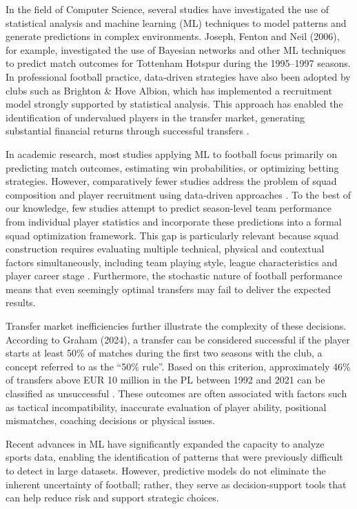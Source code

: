 \documentclass[a4paper,fleqn]{cas-sc}
\begin{document}
In the field of Computer Science, several studies have investigated the use of statistical analysis and machine learning (ML) techniques to model 
patterns and generate predictions in complex environments. Joseph, Fenton and Neil (2006), for example, investigated the use of Bayesian networks and 
other ML techniques to predict match outcomes for Tottenham Hotspur during the 1995–1997 seasons. In professional football practice, data-driven strategies 
have also been adopted by clubs such as Brighton \& Hove Albion, which has implemented a recruitment model strongly supported by statistical analysis. This 
approach has enabled the identification of undervalued players in the transfer market, generating substantial financial returns through successful 
transfers \cite{BBC2023Caicedo, CNN2023Caicedo, ESPN2023}.

In academic research, most studies applying ML to football focus primarily on predicting match outcomes, estimating win probabilities, or optimizing 
betting strategies. However, comparatively fewer studies address the problem of squad composition and player recruitment using data-driven 
approaches \cite{Abidin2021}. To the best of our knowledge, few studies attempt to predict season-level team performance from individual player statistics 
and incorporate these predictions into a formal squad optimization framework. This gap is particularly relevant because squad construction requires 
evaluating multiple technical, physical and contextual factors simultaneously, including team playing style, league characteristics and player career 
stage \cite{Abidin2021}. Furthermore, the stochastic nature of football performance means that even seemingly optimal transfers may fail to 
deliver the expected results.

Transfer market inefficiencies further illustrate the complexity of these decisions. According to Graham (2024), a transfer can be considered 
successful if the player starts at least 50\% of matches during the first two seasons with the club, a concept referred to as the ``50\% rule''. Based on 
this criterion, approximately 46\% of transfers above EUR 10 million in the PL between 1992 and 2021 can be classified as unsuccessful \cite{Graham2024}. These 
outcomes are often associated with factors such as tactical incompatibility, inaccurate evaluation of player ability, positional mismatches, coaching 
decisions or physical issues.

Recent advances in ML have significantly expanded the capacity to analyze sports data, enabling the identification of patterns that were previously 
difficult to detect in large datasets. However, predictive models do not eliminate the inherent uncertainty of football; rather, they serve as decision-support 
tools that can help reduce risk and support strategic choices.
\end{document}
